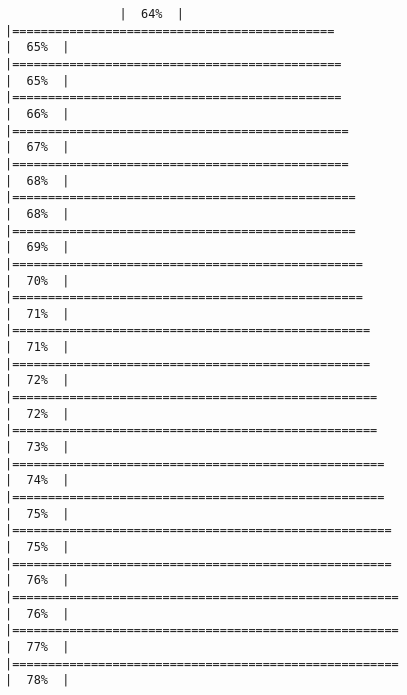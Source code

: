 \documentclass[
]{article}
\begin{document}
\begin{verbatim}
                |  64%  |                                                                              |=============================================                         |  65%  |                                                                              |==============================================                        |  65%  |                                                                              |==============================================                        |  66%  |                                                                              |===============================================                       |  67%  |                                                                              |===============================================                       |  68%  |                                                                              |================================================                      |  68%  |                                                                              |================================================                      |  69%  |                                                                              |=================================================                     |  70%  |                                                                              |=================================================                     |  71%  |                                                                              |==================================================                    |  71%  |                                                                              |==================================================                    |  72%  |                                                                              |===================================================                   |  72%  |                                                                              |===================================================                   |  73%  |                                                                              |====================================================                  |  74%  |                                                                              |====================================================                  |  75%  |                                                                              |=====================================================                 |  75%  |                                                                              |=====================================================                 |  76%  |                                                                              |======================================================                |  76%  |                                                                              |======================================================                |  77%  |                                                                              |======================================================                |  78%  |                                                                              
\end{verbatim}
\end{document}
